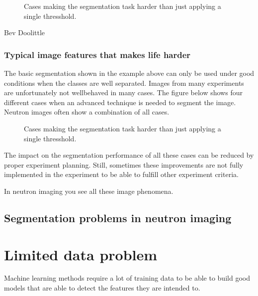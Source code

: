 \documentclass[letterpaper,10pt,english]{sphinxmanual}
\begin{document}
\begin{figure}[htbp]
\centering
\capstart

\noindent{}
\caption{Cases making the segmentation task harder than just applying a single thresshold.}\label{\detokenize{ML4NeutronImageSegmentation:id11}}\end{figure}



 Bev Doolittle


\subsection{Typical image features that makes life harder}
\label{\detokenize{ML4NeutronImageSegmentation:typical-image-features-that-makes-life-harder}}
The basic segmentation shown in the example above can only be used under good conditions when the classes are well separated. Images from many experiments are unfortunately not well\sphinxhyphen{}behaved in many cases. The figure below shows four different cases when an advanced technique is needed to segment the image. Neutron images often show a combination of all cases.

\begin{figure}[htbp]
\centering
\capstart

\noindent{}
\caption{Cases making the segmentation task harder than just applying a single thresshold.}\label{\detokenize{ML4NeutronImageSegmentation:id12}}\end{figure}

The impact on the segmentation performance of all these cases can be reduced by proper experiment planning. Still, sometimes these improvements are not fully implemented in the experiment to be able to fulfill other experiment criteria.



In neutron imaging you see all these image phenomena.


\section{Segmentation problems in neutron imaging}
\label{\detokenize{ML4NeutronImageSegmentation:segmentation-problems-in-neutron-imaging}}

\chapter{Limited data problem}
\label{\detokenize{ML4NeutronImageSegmentation:limited-data-problem}}
Machine learning methods require a lot of training data to be able to build good models that are able to detect the features they are intended to.
\end{document}
